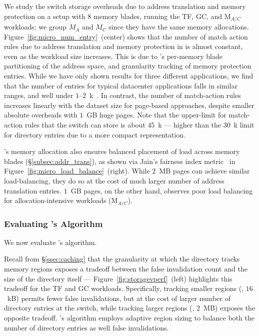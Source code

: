  We study the switch storage overheads due to address translation and memory protection on a setup with 8 memory blades, running the TF, GC, and M$_{A/C}$ workloads; we group $M_A$ and $M_C$ since they have the same memory allocations. Figure~\ref{fig:micro_num_entry}~(center) shows that the number of match action rules due to address translation and memory protection in \mind is almost constant, even as the workload size increases. This is due to \mind's per-memory blade partitioning of the address space, and  granularity tracking of memory protection entries. While we have only shown results for three different applications, we find that the number of  entries for typical datacenter applications falls in similar ranges, and well under $1$--$2$~k~\cite{vma1, vma2}. In contrast, the number of match-action rules increases linearly with the dataset size for page-based approaches, despite smaller absolute overheads with $1$~GB huge pages. Note that the upper-limit for match-action rules that the switch can store is about $45$~k --- higher than the $30$~k limit for directory entries due to a more compact representation.

\mind's memory allocation also ensures balanced placement of load across memory blades (\S\ref{subsec:addr_trans}), as shown via Jain's fairness index metric~\cite{jain} in Figure~\ref{fig:micro_load_balance}~(right). While $2$~MB pages can achieve similar load-balancing, they do so at the cost of much larger number of address translation entries. $1$~GB pages, on the other hand, observes poor load balancing for allocation-intensive workloads (M$_{A/C}$).

\subsubsection{Evaluating \mind's \mindAlgo Algorithm}
\label{sssec:mindsensitivity}

We now evaluate \mind's \mindalgo algorithm.

 Recall from \S\ref{ssec:caching} that the granularity at which the directory tracks memory regions exposes a tradeoff between the false invalidation count and the size of the directory itself --- Figure~\ref{fig:storagevperf}~(left) highlights this tradeoff for the TF and GC workloads. Specifically, tracking smaller regions (\eg, $16$~kB) permits fewer false invalidations, but at the cost of larger number of directory entries at the switch, while tracking larger regions (\eg, $2$~MB) exposes the opposite tradeoff. \mind's \mindalgo algorithm employs adaptive region sizing to balance both the number of directory entries as well false invalidations.

